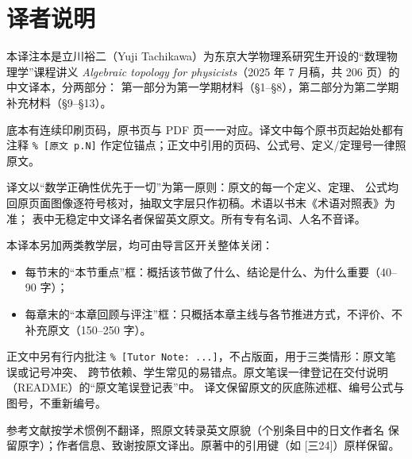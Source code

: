 \chapter*{译者说明}

本译注本是立川裕二（Yuji Tachikawa）为东京大学物理系研究生开设的“数理物理学”课程讲义
\textit{Algebraic topology for physicists}（2025 年 7 月稿，共 206 页）的中文译本，分两部分：
第一部分为第一学期材料（§1--§8），第二部分为第二学期补充材料（§9--§13）。

底本有连续印刷页码，原书页与 PDF 页一一对应。译文中每个原书页起始处都有
注释 \verb|% [原文 p.N]| 作定位锚点；正文中引用的页码、公式号、定义/定理号一律照原文。

译文以“数学正确性优先于一切”为第一原则：原文的每一个定义、定理、
公式均回原页面图像逐符号核对，抽取文字层只作初稿。术语以书末《术语对照表》为准；
表中无稳定中文译名者保留英文原文。所有专有名词、人名不音译。

本译本另加两类教学层，均可由导言区开关整体关闭：

\begin{itemize}
  \item 每节末的“本节重点”框：概括该节做了什么、结论是什么、为什么重要（40--90 字）；
  \item 每章末的“本章回顾与评注”框：只概括本章主线与各节推进方式，不评价、不补充原文（150--250 字）。
\end{itemize}

正文中另有行内批注 \verb|% [Tutor Note: ...]|，不占版面，用于三类情形：原文笔误或记号冲突、
跨节依赖、学生常见的易错点。原文笔误一律登记在交付说明（README）的“原文笔误登记表”中。
译文保留原文的灰底陈述框、编号公式与图号，不重新编号。

参考文献按学术惯例不翻译，照原文转录英文原貌（个别条目中的日文作者名
保留原字）；作者信息、致谢按原文译出。原著中的引用键（如 [三24]）原样保留。
